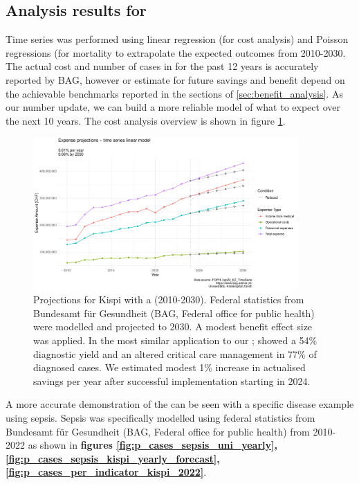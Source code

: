 \subsection{Analysis results for \pmu}
Time series was performed using linear regression (for cost analysis) and Poisson regressions (for mortality  to extrapolate the expected outcomes from 2010-2030.
The actual cost and number of cases in for the past 12 years is accurately reported by BAG, however or estimate for future savings and benefit depend on the achievable benchmarks reported in the  sections of \ref{sec:benefit_analysis}.
As our number update, we can build a more reliable model of what to expect over the next 10 years. 
The \pmu cost analysis overview is shown in figure 
\ref{fig:cost_analysis}.

\begin{figure}[h] \hspace*{0cm} 
\begin{center}
	\includegraphics[width=0.90\textwidth]{../stats/foph_key_stats/output/p_cost}
	\caption{Projections for Kispi with a \pmu (2010-2030). Federal statistics from Bundesamt für Gesundheit (BAG, Federal office for public health) were modelled and projected to 2030. A modest benefit effect size was applied. 
	In the most similar application to our \pmu; 
	\citet{lunke2023integrated} 
	showed a 54\% diagnostic yield and an altered critical care management in 77\% of diagnosed cases.
	We estimated modest 1\% increase in actualised savings per year after successful implementation starting in 2024.}
	\label{fig:cost_analysis}
\end{center}
\end{figure}

A more accurate demonstration of the \pmu can be seen with a specific disease example using sepsis.
Sepsis was specifically modelled using federal statistics from Bundesamt für Gesundheit (BAG, Federal office for public health) from 2010-2022 as shown in 
\textbf{figures
\ref{fig:p_cases_sepsis_uni_yearly},
\ref{fig:p_cases_sepsis_kispi_yearly_forecast},
\ref{fig:p_cases_per_indicator_kispi_2022}}.

